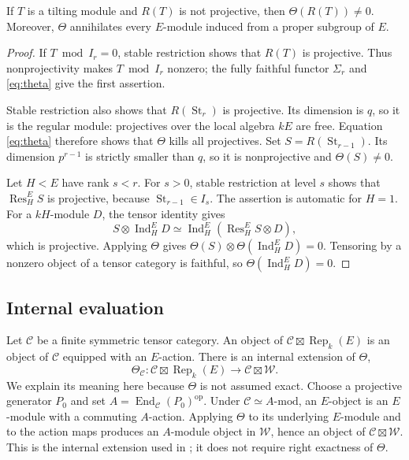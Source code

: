 \begin{lemma}\label{lem:theta-detection}
If $T$ is a tilting module and $R(T)$ is not projective, then
$\Theta(R(T))\ne0$.  Moreover, $\Theta$ annihilates every
$E$-module induced from a proper subgroup of $E$.
\end{lemma}

\begin{proof}
If $T\bmod I_r=0$, stable restriction shows that $R(T)$ is
projective.  Thus nonprojectivity makes $T\bmod I_r$ nonzero;
the fully faithful functor $\Sigma_r$ and \eqref{eq:theta} give the
first assertion.

Stable restriction also shows that $R(\operatorname{St}_r)$ is
projective.  Its dimension is $q$, so it is the regular module:
projectives over the local algebra $kE$ are free.  Equation
\eqref{eq:theta} therefore shows that $\Theta$ kills all projectives.
Set $S=R(\operatorname{St}_{r-1})$.  Its dimension $p^{r-1}$ is
strictly smaller than $q$, so it is nonprojective and $\Theta(S)\ne0$.

Let $H<E$ have rank $s<r$.  For $s>0$, stable restriction at level
$s$ shows that $\operatorname{Res}^E_H S$ is projective, because
$\operatorname{St}_{r-1}\in I_s$.  The assertion is automatic for
$H=1$.  For a $kH$-module $D$, the tensor identity gives
\[
 S\otimes\operatorname{Ind}_H^E D
 \simeq\operatorname{Ind}_H^E
       (\operatorname{Res}^E_H S\otimes D),
\]
which is projective.  Applying $\Theta$ gives
$\Theta(S)\otimes\Theta(\operatorname{Ind}_H^E D)=0$.
Tensoring by a nonzero object of a tensor category is faithful, so
$\Theta(\operatorname{Ind}_H^E D)=0$.
\end{proof}

\subsection{Internal evaluation}

Let $\mathcal C$ be a finite symmetric tensor category.  An object of
$\mathcal C\boxtimes\operatorname{Rep}_k(E)$ is an object of
$\mathcal C$ equipped with an $E$-action.  There is an internal
extension of $\Theta$,
\[
 \Theta_{\mathcal C}:\mathcal C\boxtimes\operatorname{Rep}_k(E)
       \longrightarrow\mathcal C\boxtimes\mathcal W.
\]
We explain its meaning here because $\Theta$ is not assumed exact.
Choose a projective generator $P_0$ and set
$A=\operatorname{End}_{\mathcal C}(P_0)^{\mathrm{op}}$.
Under $\mathcal C\simeq A\text{-}\mathrm{mod}$, an $E$-object is
an $E$-module with a commuting $A$-action.  Applying $\Theta$ to
its underlying $E$-module and to the action maps produces an
$A$-module object in $\mathcal W$, hence an object of
$\mathcal C\boxtimes\mathcal W$.
This is the internal extension used in
\cite[Example~3.2.4, Proposition~3.2.6, and Section~3.3.2]{CoulembierFlakeHigher}; it does not require
right exactness of $\Theta$.

